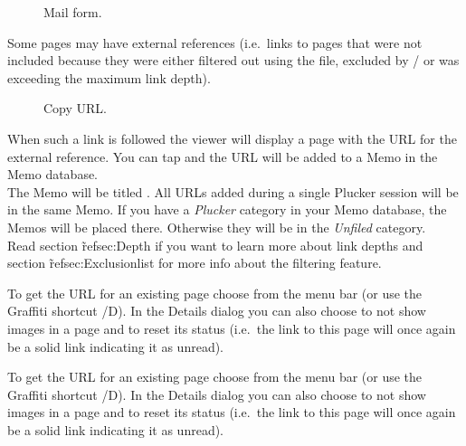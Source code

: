 \begin{figure} [!htb]
\centerline{}
\caption{\label{fig:Mail}Mail form.}
\end{figure}

Some pages may have external references (i.e.\ links to pages that 
were not included because they were either filtered out using the 
 file, excluded by /
 or was exceeding the maximum link depth).\\ 

\begin{figure} [!htb]
\centerline{\hspace{1cm}}
\caption{\label{fig:CopyURL}Copy URL.}
\end{figure}

When such a link is followed the viewer will display a page with the
URL for the external reference. You can tap  and the 
URL will be added to a Memo in the Memo database.\\

The Memo will be titled . All URLs 
added during a single Plucker session will be in the same Memo. If 
you have a \emph{Plucker} category in your Memo database, the Memos 
will be placed there. Otherwise they will be in the \emph{Unfiled} 
category.\\

Read section \~ref{sec:Depth} if you want to learn more about link 
depths and section \~ref{sec:Exclusionlist} for more info about the 
filtering feature.\\

\begin{latexonly}
To get the URL for an existing page choose  
from the menu bar (or use the Graffiti shortcut /D). In the Details dialog 
you can also choose to not show images in a page and to reset its status 
(i.e.\ the link to this page will once again be a solid link indicating it
as unread).
\end{latexonly}
\begin{htmlonly}
To get the URL for an existing page choose  from
the menu bar (or use the Graffiti shortcut /D). In the Details dialog you
can also choose to not show images in a page and to reset its status (i.e.\
the link to this page will once again be a solid link indicating it as
unread).
\end{htmlonly}


